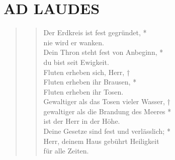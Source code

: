 




\section[PSALMI DE FESTIS]{AD LAUDES}

\begin{quote}
\begin{verse}


\smallskip
\vin Der Erdkreis ist fest gegründet, *\\  \vin nie wird er wanken.\\ 
Dein Thron steht fest von Anbeginn, *\\
du bist seit Ewigkeit.\\ \vin
Fluten erheben sich, Herr, †\\ \vin
Fluten erheben ihr Brausen, * \\ \vin Fluten erheben ihr Tosen.\\ 
Gewaltiger als das Tosen vieler Wasser, †\\
gewaltiger als die Brandung des Meeres *\\ ist der Herr in der Höhe.\\
\vin Deine Gesetze sind fest und verlässlich; *\\
\vin Herr, deinem Haus gebührt Heiligkeit\\ \vin für alle Zeiten.\\ 
\end{verse}



\end{quote}

\vspace{0.5cm}

